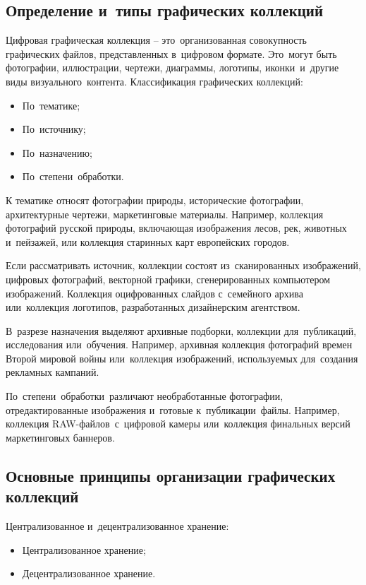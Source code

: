 \documentclass{ou}
\begin{document}
\subsection{Определение и~типы графических коллекций}
Цифровая графическая коллекция -- это~организованная совокупность графических файлов, представленных в~цифровом формате. Это~могут быть фотографии, иллюстрации, чертежи, диаграммы, логотипы, иконки~и~другие виды визуального~контента.
Классификация графических коллекций:
\begin{itemize}[label=-, leftmargin=0em, itemindent=3.35em, nosep]
\item По~тематике;
\item По~источнику;
\item По~назначению;
\item По~степени~обработки.
\end{itemize}

К тематике относят фотографии природы, исторические фотографии, архитектурные чертежи, маркетинговые материалы. Например, коллекция фотографий русской природы, включающая изображения лесов, рек, животных и~пейзажей, или коллекция старинных карт европейских городов.

Если рассматривать источник, коллекции состоят из~сканированных изображений, цифровых фотографий, векторной графики, сгенерированных компьютером изображений. Коллекция оцифрованных слайдов с~семейного архива или~коллекция логотипов, разработанных дизайнерским агентством.

В~разрезе назначения выделяют архивные подборки, коллекции для~публикаций, исследования или~обучения. Например, архивная коллекция фотографий времен Второй мировой войны или~коллекция изображений, используемых для~создания рекламных кампаний.

По~степени~обработки~различают необработанные фотографии, отредактированные изображения и~готовые к~публикации~файлы. Например, коллекция RAW-файлов~с~цифровой камеры или~коллекция финальных версий маркетинговых баннеров.
\subsection{Основные принципы организации графических коллекций}
Централизованное и~децентрализованное хранение:
\begin{itemize}[label=-, leftmargin=0em, itemindent=3.35em, nosep]
\item Централизованное хранение;
\item Децентрализованное хранение.
\end{itemize}
\end{document}
